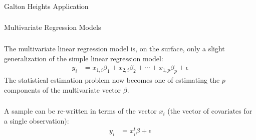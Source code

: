 \begin{frame}[fragile] \frametitle{}

\begin{flushright}
{\color{yaleblue}\sc\fontsize{1cm}{0cm}\selectfont Galton Heights Application}
\end{flushright}

\end{frame}

\begin{frame}[fragile] \frametitle{}

\begin{flushright}
{\color{yaleblue}\sc\fontsize{1cm}{0cm}\selectfont Multivariate Regression Models}
\end{flushright}

\end{frame}

\begin{frame}[fragile] \frametitle{}

The multivariate linear regression model is, on the surface,
only a slight generalization of the simple linear regression model:
\begin{align*}
y_i &= x_{1,i} \beta_1 + x_{2,i} \beta_2 + \cdots + x_{1,p} \beta_p + \epsilon
\end{align*}
\pause The statistical estimation problem now becomes one of
estimating the $p$ components of the multivariate vector $\beta$.

\end{frame}


\begin{frame}[fragile] \frametitle{}

A sample can be re-written in terms of the vector $x_i$
(the vector of covariates for a single observation):
\begin{align*}
y_i &= x_{i}^t \beta + \epsilon
\end{align*}

\end{frame}

